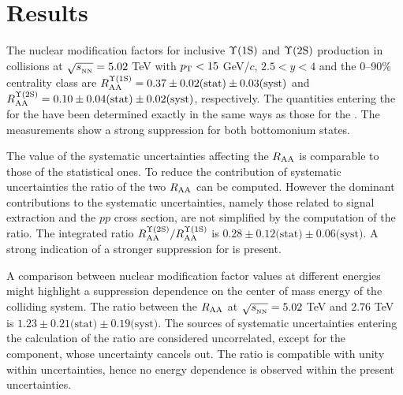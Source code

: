 
\section{Results}\label{section:results}

The nuclear modification factors for  inclusive $\mbox{$\Upsilon$(1S)}$ and $\mbox{$\Upsilon$(2S)}$ production in \pbpb collisions at $\sqrt{s_{_{\rm NN}}}=5.02$ \rm{TeV} with $p_{\rm T} < 15$ GeV/$c$, $2.5 < y < 4$ and the 0--90\% centrality class are $R_{\rm{AA}}^{\Upsilon(\rm1S)}=0.37\pm0.02\text{(stat)}\pm0.03\text{(syst)}$  and $R_{\rm{AA}}^{\Upsilon(\rm2S)}=0.10\pm{0.04}\text{(stat)}\pm{0.02}\text{(syst)}$, respectively.
The quantities entering the \raa for the \upsiss have been determined exactly in the same ways as those for the \upsis.
The measurements show a strong suppression for both bottomonium states.

The value of the systematic uncertainties affecting the $R_{\rm{AA}}$ is comparable to those of the statistical ones.
To reduce the contribution of systematic uncertainties the ratio of the two $R_{\rm{AA}}$ can be computed.
However the dominant contributions to the systematic uncertainties, namely those related to signal extraction and the $pp$ cross section, are not simplified by the computation of the ratio.
The integrated ratio $R_{\rm{AA}}^{\Upsilon(\rm2S)}/R_{\rm{AA}}^{\Upsilon(\rm1S)}$ is $0.28\pm0.12\text{(stat)}\pm0.06\text{(syst)}$. 
A strong indication of a stronger suppression for \upsiss is present.

A comparison between \upsis nuclear modification factor values at different energies might highlight a suppression dependence on the center of mass energy of the colliding system.
The ratio between the \upsis $\mbox{$R_{\rm{AA}}$}$ at $\sqrt{s_{_{\rm NN}}}=5.02$ \rm{TeV} and $2.76$ \rm{TeV} is $1.23\pm0.21\text{(stat)}\pm0.19\text{(syst)}$. 
The sources of systematic uncertainties entering the calculation of the ratio are considered uncorrelated, except for the \taa component, whose uncertainty cancels out. 
The ratio is compatible with unity within uncertainties, hence no energy dependence is observed within the present uncertainties.

